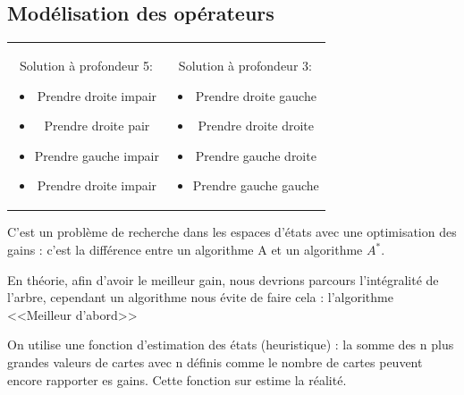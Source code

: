 \documentclass[12pt,a4paper,openany]{book}
\begin{document}
	\subsection{Modélisation des opérateurs}
	\begin{tabular}{cc}
		\begin{minipage}{0.5\textwidth}
			Solution à profondeur 5: 
			\begin{itemize}
				\item Prendre droite impair
				\item Prendre droite pair
				\item Prendre gauche impair
				\item Prendre droite impair
			\end{itemize}
		\end{minipage}
		&
		\begin{minipage}{0.5\textwidth}
			Solution à profondeur 3: 
			\begin{itemize}
				\item Prendre droite gauche
				\item Prendre droite droite
				\item Prendre gauche droite
				\item Prendre gauche gauche
			\end{itemize}
		\end{minipage}
	\end{tabular}

	C'est un problème de recherche dans les espaces d'états avec une optimisation des gains : c'est la différence entre un algorithme A et un
	algorithme $A^*$.

	En théorie, afin d'avoir le meilleur gain, nous devrions parcours l'intégralité de l'arbre, cependant un algorithme nous évite de faire cela :
	l'algorithme <<Meilleur d'abord>>

	On utilise une fonction d'estimation des états (heuristique) : la somme des n plus grandes valeurs de cartes avec n définis comme le nombre de
	cartes peuvent encore rapporter es gains. Cette fonction sur estime la réalité.
\end{document}
